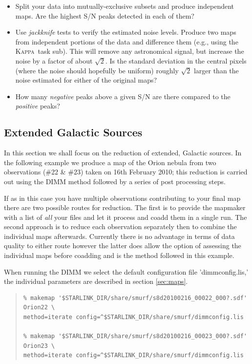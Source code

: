 \documentclass[twoside,11pt]{article}
\newcommand{\xref}[3]{#1}
\newcommand{\xlabel}[1]{}
\renewcommand{\_}{\texttt{\symbol{95}}}
\newenvironment{myquote}{\begin{quote}\begin{small}}{\end{small}\end{quote}}
\newcommand{\Kappa}{\xref{\textsc{Kappa}}{sun95}{}}
\newcommand{\task}[1]{\textsf{#1}}
\newcommand{\sub}{\xref{\task{sub}}{sun95}{SUB}}
\begin{document}
\begin{itemize}

\item Split your data into mutually-exclusive subsets and produce
  independent maps. Are the highest S/N peaks detected in each of
  them?

\item Use {\em jackknife} tests to verify the estimated noise
  levels. Produce two maps from independent portions of the data and
  difference them (e.g., using the \Kappa\ task \sub). This will
  remove any astronomical signal, but increase the noise by a factor
  of about $\sqrt{2}$. Is the standard deviation in the central pixels
  (where the noise should hopefully be uniform) roughly $\sqrt{2}$
  larger than the noise estimated for either of the original maps?

\item How many {\em negative} peaks above a given S/N are there
  compared to the {\em positive} peaks?

\end{itemize}

\subsection{\xlabel{Galactic}Extended Galactic Sources}
\label{sec:galactic}
In this section we shall focus on the reduction of extended, Galactic
sources. In the following example we produce a map of the Orion nebula
from two observations (\#22 \& \#23) taken on 16th February 2010; this
reduction is carried out using the DIMM method followed by a series of
post processing steps.

If as in this case you have multiple observations contributing to your
final map there are two possible routes for reduction. The first is to
provide the mapmaker with a list of \textit{all} your files and let it
process and coadd them in a single run.  The second approach is to
reduce each observation separately then to combine the individual maps
afterwards. Currently there is no advantage in terms of data quality
to either route however the latter does allow the option of assessing
the individual maps before coadding and is the method followed in this
example.

When running the DIMM we select the default configuration file
'dimmconfig.lis,' the individual parameters are described in section
\ref{sec:maps}.

\begin{myquote}
\begin{verbatim}
% makemap '$STARLINK_DIR/share/smurf/s8d20100216_00022_000?.sdf' Orion22 \
method=iterate config=^$STARLINK_DIR/share/smurf/dimmconfig.lis

% makemap '$STARLINK_DIR/share/smurf/s8d20100216_00023_000?.sdf' Orion23 \
method=iterate config=^$STARLINK_DIR/share/smurf/dimmconfig.lis
\end{verbatim}
\end{myquote}
\end{document}
